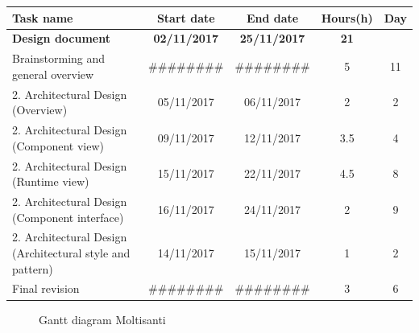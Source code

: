 \begin{table}[h!]
	\begin{tabular}{lcccc}
		\toprule
		\textbf{Task name} & \textbf{Start date} & \textbf{End date} & \textbf{Hours(h)} & \textbf{Day} \\
		\midrule
		\textbf{Design document} & \textbf{02/11/2017} & \textbf{25/11/2017} & \textbf{21} &  \\
		Brainstorming and general overview & \#\#\#\#\#\#\#\# & \#\#\#\#\#\#\#\# & 5 & 11 \\
		2. Architectural Design (Overview) & 05/11/2017 & 06/11/2017 & 2 & 2 \\
		2. Architectural Design (Component view) & 09/11/2017 & 12/11/2017 & 3.5 & 4 \\
		2. Architectural Design (Runtime view) & 15/11/2017 & 22/11/2017 & 4.5 & 8 \\
		2. Architectural Design (Component interface) & 16/11/2017 & 24/11/2017 & 2 & 9 \\
		2. Architectural Design (Architectural style and pattern) & 14/11/2017 & 15/11/2017 & 1 & 2 \\
		\bottomrule
		Final revision & \#\#\#\#\#\#\#\# & \#\#\#\#\#\#\#\# & 3 & 6 \\
	\end{tabular}
\end{table}

\begin{figure}[!h]
	\centering
	\caption{Gantt diagram Moltisanti}
\end{figure}
\clearpage